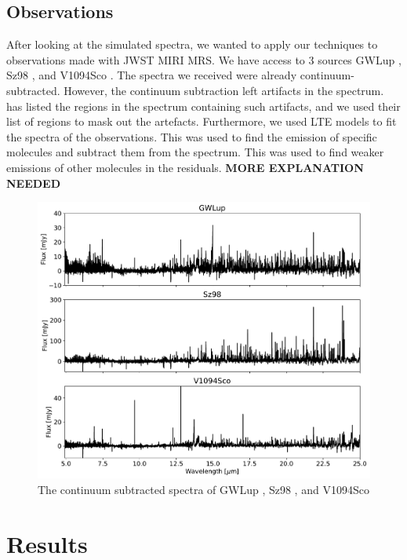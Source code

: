 \documentclass[twoside, single, authoryear, semicolon]{lion-msc}
\newcommand{\4}{$_4$}
\newcommand{\3}{$_3$}
\newcommand{\2}{$_2$}
\begin{document}
\section{Observations}
After looking at the simulated spectra, we wanted to apply our techniques to observations made with JWST MIRI MRS. We have access to 3 sources  GWLup \citep{Gasman_2023}, Sz98 \citep{Grant_2023}, and V1094Sco \citep{taboneinprepp}. The spectra we received were already continuum-subtracted. However, the continuum subtraction left artifacts in the spectrum. \cite{Grant_2023} has listed the regions in the spectrum containing such artifacts, and we used their list of regions to mask out the artefacts. Furthermore, we used LTE models to fit the spectra of the observations. This was used to find the emission of specific molecules and subtract them from the spectrum. This was used to find weaker emissions of other molecules in the residuals. 
\textbf{MORE EXPLANATION NEEDED}

\begin{figure}[!ht]
    \centering
    \includegraphics[width=\linewidth]{Figures/Measurements.pdf}
    \caption{The continuum subtracted spectra of GWLup \citep{Gasman_2023}, Sz98 \citep{Grant_2023}, and V1094Sco \citep{taboneinprepp}}
    \label{fig: Measurments}
\end{figure}



\chapter{Results}\label{Ch: Results}
\end{document}

